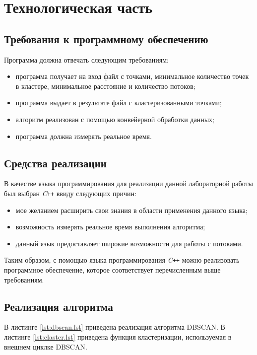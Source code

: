 \chapter{Технологическая часть}

\section{Требования к программному обеспечению}

Программа должна отвечать следующим требованиям:
\begin{itemize}[label=---]
	\item программа получает на вход файл с точками, минимальное количество точек в кластере, минимальное расстояние и количество потоков;
	\item программа выдает в результате файл с кластеризованными точками;
	\item алгоритм реализован с помощью конвейерной обработки данных;
	\item программа должна измерять реальное время.
\end{itemize}

\section{Средства реализации}

В качестве языка программирования для реализации данной лабораторной работы был выбран \textit{C\texttt{++}} ввиду следующих причин:
\begin{itemize}[label=---]
	\item мое желанием расширить свои знания в области применения данного языка;
	\item возможность измерять реальное время выполнения алгоритма;
	\item данный язык предоставляет широкие возможности для работы с потоками.
\end{itemize}

Таким образом, с помощью языка программирования \textit{C\texttt{++}} можно реализовать программное обеспечение, которое соответствует перечисленным выше требованиям.

\section{Реализация алгоритма}

В листинге \ref{lst:dbscan.lst} приведена реализация алгоритма DBSCAN.
В листинге \ref{lst:claster.lst} приведена функция кластеризации, используемая в внешнем циклке DBSCAN.
\clearpage
{}
\clearpage	
{}
\clearpage

